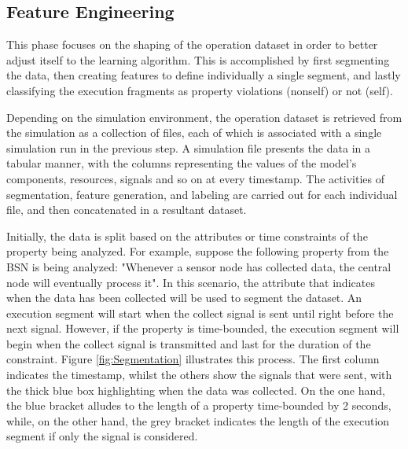

\subsection{Feature Engineering}
\label{sec:feat_eng}

This phase focuses on the shaping of the operation dataset in order to better adjust itself to the learning algorithm. This is accomplished by first segmenting the data, then creating features to define individually a single segment, and lastly classifying the execution fragments as property violations (nonself) or not (self). 

Depending on the simulation environment, the operation dataset is retrieved from the simulation as a collection of files, each of which is associated with a single simulation run in the previous step. A simulation file presents the data in a tabular manner, with the columns representing the values of the model's components, resources, signals and so on at every timestamp. The activities of segmentation, feature generation, and labeling are carried out for each individual file, and then concatenated in a resultant dataset.

Initially, the data is split based on the attributes or time constraints of the property being analyzed. For example, suppose the following property from the BSN is being analyzed: "Whenever a sensor node has collected data, the central node will eventually process it". In this scenario, the attribute that indicates when the data has been collected will be used to segment the dataset. An execution segment will start when the collect signal is sent until right before the next signal. However, if the property is time-bounded, the execution segment will begin when the collect signal is transmitted and last for the duration of the constraint. Figure \ref{fig:Segmentation} illustrates this process. The first column indicates the timestamp, whilst the others show the signals that were sent, with the thick blue box highlighting when the data was collected. On the one hand, the blue bracket alludes to the length of a property time-bounded by 2 seconds, while, on the other hand, the grey bracket indicates the length of the execution segment if only the signal is considered.

